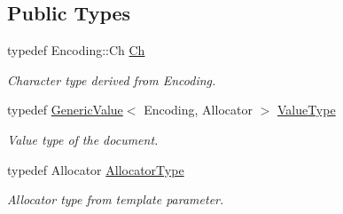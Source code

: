 \subsection*{Public Types}
\begin{DoxyCompactItemize}
\item 
typedef Encoding\+::\+Ch \hyperlink{classGenericDocument_a6f5b0b7b6626508d094ae67490269700}{Ch}
\begin{DoxyCompactList}\small\item\em Character type derived from Encoding. \end{DoxyCompactList}\item 
typedef \hyperlink{classGenericValue}{Generic\+Value}$<$ Encoding, Allocator $>$ \hyperlink{classGenericDocument_a8936205dc215dda029060d7e835e0549}{Value\+Type}
\begin{DoxyCompactList}\small\item\em Value type of the document. \end{DoxyCompactList}\item 
typedef Allocator \hyperlink{classGenericDocument_a35155b912da66ced38d22e2551364c57}{Allocator\+Type}
\begin{DoxyCompactList}\small\item\em Allocator type from template parameter. \end{DoxyCompactList}\end{DoxyCompactItemize}
